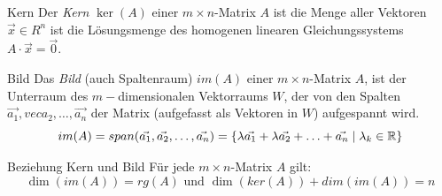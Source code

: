 \begin{definition}{Kern}
    Der \textit{Kern} $\ker(A)$ einer $m\times n$-Matrix $A$ ist die Menge aller 
    Vektoren $\vec{x}\in R^n$ ist die Lösungsmenge des homogenen linearen Gleichungssystems
    $A\cdot\vec{x}=\vec{0}$.
\end{definition}

\begin{definition}{Bild}
    Das \textit{Bild} (auch Spaltenraum) $im(A)$ einer $m\times n$-Matrix $A$,
    ist der Unterraum des $m-$dimensionalen Vektorraums $W$, der von den Spalten
    $\vec{a_1}, vec{a_2}, \ldots, \vec{a_n}$ der Matrix (aufgefasst als Vektoren in $W$) aufgespannt wird.
    \begin{equation*}
        im(A)=span(\vec{a_1}, \vec{a_2}, \ldots, \vec{a_n})
        = \{\lambda\vec{a_1}+\lambda\vec{a_2}+\ldots+\vec{a_n}\mid \lambda_k\in\mathbb{R}\}
    \end{equation*}
\end{definition}

\begin{theorem}{Beziehung Kern und Bild}
    Für jede $m\times n$-Matrix $A$ gilt:
    \begin{equation*}
         \dim(im(A))=rg(A)\text{ und } \dim(ker(A))+dim(im(A))=n
    \end{equation*}
\end{theorem}

